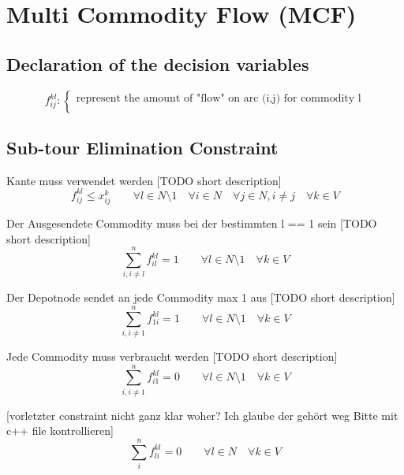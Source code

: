 \documentclass[a4paper]{article}
\begin{document}
\section*{Multi Commodity Flow (MCF)}
\subsection*{Declaration of the decision variables}
\begin{equation*}
f_{ij}^{kl} : 
	\begin{cases}
	\text{represent the amount of "flow" on arc (i,j) for commodity l} \\
	\end{cases}
\end{equation*}

\subsection*{Sub-tour Elimination Constraint}
Kante muss verwendet werden [TODO short description]
\begin{equation}
f_{ij}^{kl} \leq x_{ij}^k		 \quad 
\quad \forall l \in N \setminus {1}
\quad \forall i \in N 
\quad \forall j \in N , i \neq j
\quad \forall k \in V 
\end{equation}

Der Ausgesendete Commodity muss bei der bestimmten l == 1 sein [TODO short description]
\begin{equation}
\sum_{i, i \neq l}^n f_{il}^{kl} = 1		 \quad 
\quad \forall l \in N \setminus {1}
\quad \forall k \in V 
\end{equation}

Der Depotnode sendet an jede Commodity max 1 aus [TODO short description]
\begin{equation}
\sum_{i, i \neq 1}^n f_{1i}^{kl} = 1		 \quad 
\quad \forall l \in N \setminus {1}
\quad \forall k \in V 
\end{equation}

Jede Commodity muss verbraucht werden [TODO short description]
\begin{equation}
\sum_{i, i \neq 1}^n f_{i1}^{kl} = 0		 \quad 
\quad \forall l \in N \setminus {1}
\quad \forall k \in V 
\end{equation}

[vorletzter constraint nicht ganz klar woher? Ich glaube der gehört weg Bitte mit c++ file kontrollieren]
\begin{equation}
\sum_{i}^n f_{li}^{kl} = 0		 \quad 
\quad \forall l \in N 
\quad \forall k \in V 
\end{equation}
\end{document}
